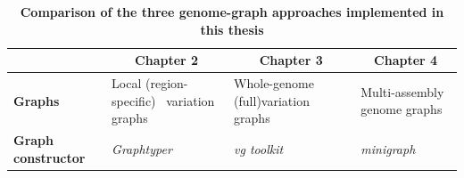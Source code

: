 \documentclass[../main.tex]{subfiles}
\begin{document}
\begin{landscape}
   \thispagestyle{plain}
   \begin{table}
      \centering
      \footnotesize
      \caption[Comparison of the genome graph implementations]{\textbf{Comparison of the three genome-graph approaches implemented in this thesis}}
      \begin{tabular}{|l|l|l|l|} 
      \cline{2-4}
      \multicolumn{1}{l|}{~}                                                                              & \multicolumn{1}{c|}{\textbf{Chapter 2}}                                                                                                                                                                                                                                 & \multicolumn{1}{c|}{\textbf{Chapter 3}}                                                                                                                                                                                   & \multicolumn{1}{c|}{\textbf{Chapter 4}}                                                                                                                                                                                                                            \\ 
      \hline
      \textbf{Graphs}                                                                                     & Local (region-specific) ~variation graphs                                                                                                                                                                                                                               & Whole-genome (full)variation graphs                                                                                                                                                                                       & Multi-assembly genome graphs                                                                                                                                                                                                                                       \\ 
      \hline
      \textbf{Graph constructor}                                                                          & \textit{Graphtyper}                                                                                                                                                                                                                                                     & \textit{vg toolkit}                                                                                                                                                                                                       & \textit{minigraph}                                                                                                                                                                                                                                                 \\ 

\end{tabular}
\end{table}
\end{landscape}
\end{document}
